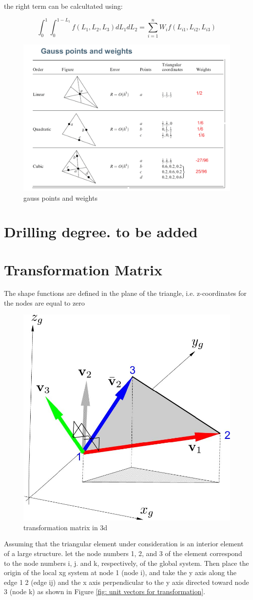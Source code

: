 the right term can be calcultated using:

\begin{equation}\label{key}
\int_{0}^{1} \int_{0}^{1-L_1} f(L_1, L_2, L_3) dL_1 dL_2 = \sum_{i=1}^{n} W_i f(L_{i1}, L_{i2}, L_{i3})
\end{equation}

\begin{figure}[h!]
\centering
\includegraphics[width=0.4\linewidth]{figure/gauss_points_and_weights}
\caption{gauss points and weights}
\label{fig: gauss points and weights}
\end{figure}

\section{Drilling degree. to be added}

\section{Transformation Matrix}
The shape functions are defined in the plane of the triangle, i.e. z-coordinates for the nodes are equal to zero

\begin{figure}[h!]
	\centering
	\includegraphics[width=0.5\linewidth]{figure/transformation_matrix}
	\caption{transformation matrix in 3d}
	\label{fig:transformationmatrix}
\end{figure}

Assuming that the triangular element under consideration is an interior element of a large structure. let the node numbers 1, 2, and 3 of the element correspond to the node numbers i, j. and
k, respectively, of the global system. Then place the origin of the local xg system at node 1 (node i), and take the y axis along the edge 1 2 (edge ij) and the x axis perpendicular
to the y axis directed toward node 3 (node k) as shown in Figure \ref{fig: unit vectors for transformation}.

